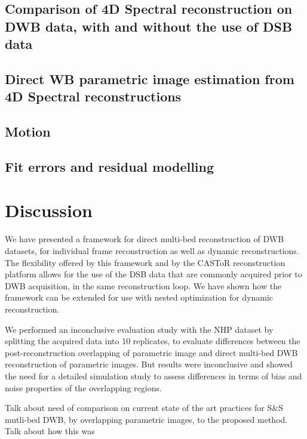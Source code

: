 \subsection{Comparison of 4D Spectral reconstruction on DWB data, with and without the use of DSB data}

\subsection{Direct WB parametric image estimation from 4D Spectral reconstructions}

\subsection{Motion}

\subsection{Fit errors and residual modelling}


\newpage
\newpage
\newpage
\section{Discussion}
We have presented a framework for direct multi-bed reconstruction of DWB datasets, for individual frame reconstruction as well as dynamic reconstructions. The flexibility offered by this framework and by the CASToR reconstruction platform allows for the use of the DSB data that are commonly acquired prior to DWB acquisition, in the same reconstruction loop. We have shown how the framework can be extended for use with nested optimization for dynamic reconstruction.

We performed an inconclusive evaluation study with the NHP dataset by splitting the acquired data into 10 replicates, to evaluate differences between the post-reconstruction overlapping of parametric image and direct multi-bed DWB reconstruction of parametric images. But results were inconclusive and showed the need for a detailed simulation study to assess differences in terms of bias and noise properties of the overlapping regions. 

Talk about need of comparison on current state of the art practices for S\&S mutli-bed DWB, by overlapping parametric images, to the proposed method. Talk about how this was 
